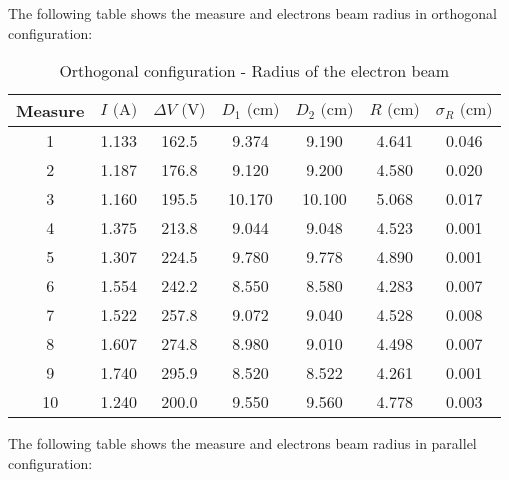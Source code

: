 The following table shows the measure and electrons beam radius in orthogonal configuration:
\begin{table}[!htbp]
    {\par\centering
    \begin{tabular}{ccccccc}
        \hline
        Measure & $I \text{ (A)}$ & $\Delta V \text{ (V)}$ & $D_1 \text{ (cm)}$ & $D_2 \text{ (cm)}$ & $R \text{ (cm)}$ & $\sigma_R \text{ (cm)}$ \\
       \hline
       1   &   1.133&   162.5&   9.374&   9.190& 4.641 & 0.046\\
       2   &   1.187&   176.8&   9.120&   9.200& 4.580 & 0.020\\
       3   &   1.160&   195.5&  10.170&  10.100& 5.068 & 0.017\\
       4   &   1.375&   213.8&   9.044&   9.048& 4.523 & 0.001\\
       5   &   1.307&   224.5&   9.780&   9.778& 4.890 & 0.001\\
       6   &   1.554&   242.2&   8.550&   8.580& 4.283 & 0.007\\
       7   &   1.522&   257.8&   9.072&   9.040& 4.528 & 0.008\\
       8   &   1.607&   274.8&   8.980&   9.010& 4.498 & 0.007\\
       9   &   1.740&   295.9&   8.520&   8.522& 4.261 & 0.001\\
       10  &   1.240&   200.0&   9.550&   9.560& 4.778 & 0.003\\
       \hline
   \end{tabular}
   \par}
   \caption{Orthogonal configuration - Radius of the electron beam}
\end{table}

The following table shows the measure and electrons beam radius in parallel configuration:


